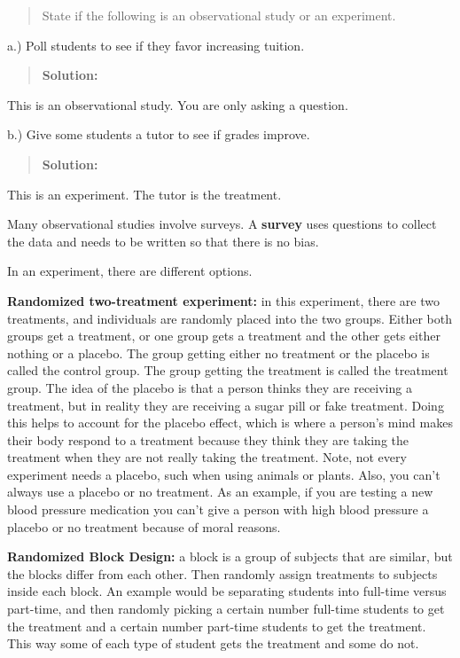 \documentclass[]{book}
\begin{document}
\begin{quote}
State if the following is an observational study or an experiment.
\end{quote}

a.) Poll students to see if they favor increasing tuition.

\begin{quote}
\textbf{Solution:}
\end{quote}

This is an observational study. You are only asking a question.

b.) Give some students a tutor to see if grades improve.

\begin{quote}
\textbf{Solution:}
\end{quote}

This is an experiment. The tutor is the treatment.

Many observational studies involve surveys. A \textbf{survey} uses questions
to collect the data and needs to be written so that there is no bias.

In an experiment, there are different options.

\textbf{Randomized two-treatment experiment:} in this experiment, there are
two treatments, and individuals are randomly placed into the two groups.
Either both groups get a treatment, or one group gets a treatment and
the other gets either nothing or a placebo. The group getting either no
treatment or the placebo is called the control group. The group getting
the treatment is called the treatment group. The idea of the placebo is
that a person thinks they are receiving a treatment, but in reality they
are receiving a sugar pill or fake treatment. Doing this helps to
account for the placebo effect, which is where a person's mind makes
their body respond to a treatment because they think they are taking the
treatment when they are not really taking the treatment. Note, not every
experiment needs a placebo, such when using animals or plants. Also, you
can't always use a placebo or no treatment. As an example, if you are
testing a new blood pressure medication you can't give a person with
high blood pressure a placebo or no treatment because of moral reasons.

\textbf{Randomized Block Design:} a block is a group of subjects that are
similar, but the blocks differ from each other. Then randomly assign
treatments to subjects inside each block. An example would be separating
students into full-time versus part-time, and then randomly picking a
certain number full-time students to get the treatment and a certain
number part-time students to get the treatment. This way some of each
type of student gets the treatment and some do not.
\end{document}
